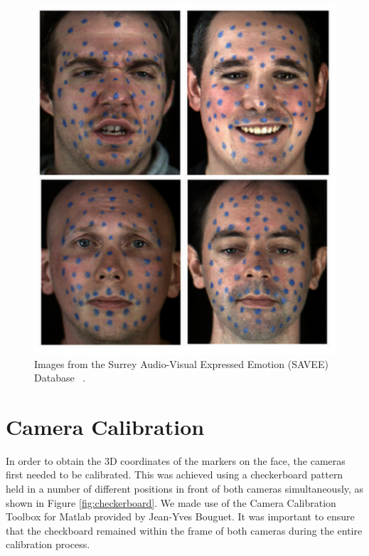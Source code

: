 \documentclass[11pt]{report}
\begin{document}
\begin{figure}[htbp!]
\begin{minipage}[b]{0.5\textwidth}
\includegraphics[width=\textwidth]{img/surreydata}
	\caption{ Images from the Surrey Audio-Visual Expressed Emotion (SAVEE) Database ~\cite{Surrey}.}
	\label{fig:surreydata}	
\end{minipage}
\end{figure}


\section{Camera Calibration}

In order to obtain the 3D coordinates of the markers on the face, the cameras first needed to be calibrated. This was achieved using a checkerboard pattern held in a number of different positions in front of both cameras simultaneously, as shown in Figure \ref{fig:checkerboard}. We made use of the Camera Calibration Toolbox for Matlab \cite{Calib} provided by Jean-Yves Bouguet. It was important to ensure that the checkboard remained within the frame of both cameras during the entire calibration process. 
\end{document}
